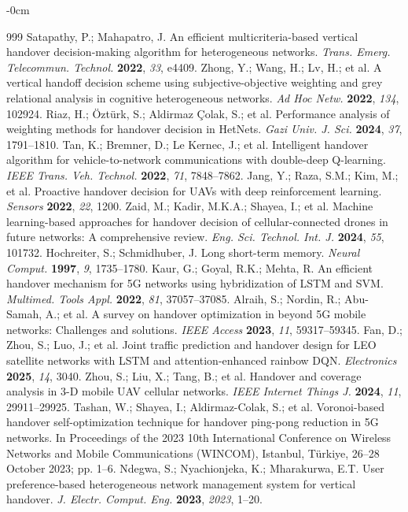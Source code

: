 \documentclass[remotesensing,article,submit,moreauthors]{Definitions/mdpi}
\begin{document}
\begin{adjustwidth}{-\extralength}{0cm}
\begin{thebibliography}{999}
Satapathy, P.; Mahapatro, J. An efficient multicriteria-based vertical handover decision-making algorithm for heterogeneous networks. {\em Trans. Emerg. Telecommun. Technol.} {\bf 2022}, {\em 33}, e4409.
Zhong, Y.; Wang, H.; Lv, H.; et al. A vertical handoff decision scheme using subjective-objective weighting and grey relational analysis in cognitive heterogeneous networks. {\em Ad Hoc Netw.} {\bf 2022}, {\em 134}, 102924.
Riaz, H.; Öztürk, S.; Aldirmaz Çolak, S.; et al. Performance analysis of weighting methods for handover decision in HetNets. {\em Gazi Univ. J. Sci.} {\bf 2024}, {\em 37}, 1791--1810.
Tan, K.; Bremner, D.; Le Kernec, J.; et al. Intelligent handover algorithm for vehicle-to-network communications with double-deep Q-learning. {\em IEEE Trans. Veh. Technol.} {\bf 2022}, {\em 71}, 7848--7862.
Jang, Y.; Raza, S.M.; Kim, M.; et al. Proactive handover decision for UAVs with deep reinforcement learning. {\em Sensors} {\bf 2022}, {\em 22}, 1200.
Zaid, M.; Kadir, M.K.A.; Shayea, I.; et al. Machine learning-based approaches for handover decision of cellular-connected drones in future networks: A comprehensive review. {\em Eng. Sci. Technol. Int. J.} {\bf 2024}, {\em 55}, 101732.
Hochreiter, S.; Schmidhuber, J. Long short-term memory. {\em Neural Comput.} {\bf 1997}, {\em 9}, 1735--1780.
Kaur, G.; Goyal, R.K.; Mehta, R. An efficient handover mechanism for 5G networks using hybridization of LSTM and SVM. {\em Multimed. Tools Appl.} {\bf 2022}, {\em 81}, 37057--37085.
Alraih, S.; Nordin, R.; Abu-Samah, A.; et al. A survey on handover optimization in beyond 5G mobile networks: Challenges and solutions. {\em IEEE Access} {\bf 2023}, {\em 11}, 59317--59345.
Fan, D.; Zhou, S.; Luo, J.; et al. Joint traffic prediction and handover design for LEO satellite networks with LSTM and attention-enhanced rainbow DQN. {\em Electronics} {\bf 2025}, {\em 14}, 3040.
Zhou, S.; Liu, X.; Tang, B.; et al. Handover and coverage analysis in 3-D mobile UAV cellular networks. {\em IEEE Internet Things J.} {\bf 2024}, {\em 11}, 29911--29925.
Tashan, W.; Shayea, I.; Aldirmaz-Colak, S.; et al. Voronoi-based handover self-optimization technique for handover ping-pong reduction in 5G networks. In Proceedings of the 2023 10th International Conference on Wireless Networks and Mobile Communications (WINCOM), Istanbul, Türkiye, 26--28 October 2023; pp. 1--6.
Ndegwa, S.; Nyachionjeka, K.; Mharakurwa, E.T. User preference-based heterogeneous network management system for vertical handover. {\em J. Electr. Comput. Eng.} {\bf 2023}, {\em 2023}, 1--20.

\end{thebibliography}
\end{adjustwidth}
\end{document}

